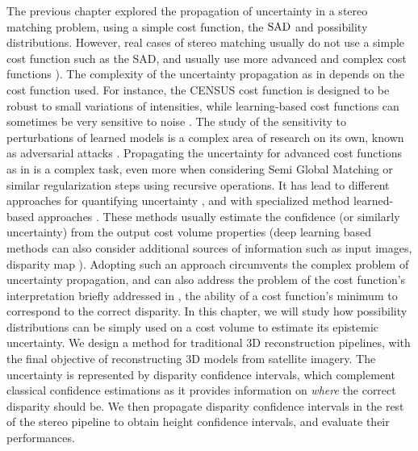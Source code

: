 The previous chapter explored the propagation of uncertainty in a stereo matching problem, using a simple cost function, the $\mathrm{SAD}$ and possibility distributions. However, real cases of stereo matching usually do not use a simple cost function such as the SAD, and usually use more advanced and complex cost functions \cite{zabih_non-parametric_1994,zbontar_stereo_2016,laga_survey_2022}). The complexity of the uncertainty propagation as in  depends on the cost function used. For instance, the CENSUS cost function \cite{zabih_non-parametric_1994} is designed to be robust to small variations of intensities, while learning-based cost functions can sometimes be very sensitive to noise \cite{szegedy_intriguing_2013,carlini_towards_2017}. The study of the sensitivity to perturbations of learned models is a complex area of research on its own, known as adversarial attacks \cite{chen_shapeshifter_2018, zhao_seeing_2019}. Propagating the uncertainty for advanced cost functions as in  is a complex task, even more when considering Semi Global Matching or similar regularization steps using recursive operations. It has lead to different approaches for quantifying uncertainty \cite{hu_quantitative_2012}, and with specialized method learned-based approaches \cite{laga_survey_2022,poggi_confidence_2021,wang_uncertainty_2022}. These methods usually estimate the confidence (or similarly uncertainty) from the output cost volume properties (deep learning based methods can also consider additional sources of information such as input images, disparity map \etc). Adopting such an approach circumvents the complex problem of uncertainty propagation, and can also address the problem of the cost function's interpretation briefly addressed in , \ie the ability of a cost function's minimum to correspond to the correct disparity. In this chapter, we will study how possibility distributions can be simply used on a cost volume to estimate its epistemic uncertainty. We design a method for traditional 3D reconstruction pipelines, with the final objective of reconstructing 3D models from satellite imagery. The uncertainty is represented by disparity confidence intervals, which complement classical confidence estimations as it provides information on \textit{where} the correct disparity should be. We then propagate disparity confidence intervals in the rest of the stereo pipeline to obtain height confidence intervals, and evaluate their performances.

